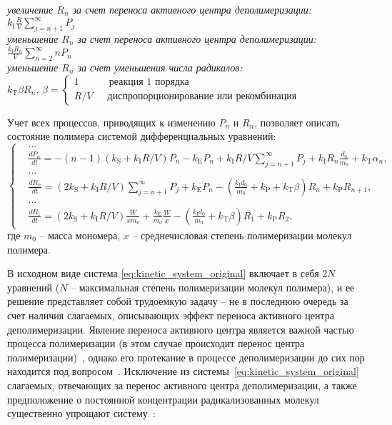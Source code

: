 \begin{center}
	\textit{увеличение $R_n$ за счет переноса активного центра деполимеризации:} \\
	${\displaystyle k_\mathrm{I} \frac{R}{V} \sum_{j=n+1}^{\infty} P_j}$ \\
	\textit{уменьшение $R_n$ за счет переноса активного центра деполимеризации:} \\
	${\displaystyle \frac{k_\mathrm{I} R_n}{V} \sum_{n=2}^{\infty} n P_n}$ \\
	\textit{уменьшение $R_n$ за счет уменьшения числа радикалов:} \\
	$k_\mathrm{T} \beta R_n$, $\beta = \left\{
	\begin{array}{l}
		1 \quad\quad\quad \text{реакция 1 порядка} \\
		R / V \quad\;\: \text{диспропорционирование или рекомбинация}
	\end{array}\right.$ \\
\end{center}

Учет всех процессов, приводящих к изменению $P_n$ и $R_n$, позволяет описать состояние полимера системой дифференциальных уравнений:
\begin{equation} \label{eq:kinetic_system_original}
	\left\{
	\begin{aligned}
		&\dots \\
		&\frac{d P_n}{d t} = -(n-1)\left(k_\mathrm{S} + k_\mathrm{I} R / V\right) P_n - k_\mathrm{E} P_n + k_\mathrm{I} R / V \sum_{j=n+1}^{\infty} P_j + k_\mathrm{I} R_n \frac{d_0}{m_0} + k_\mathrm{T} \alpha_n, \\
		&\dots \\
		&\frac{d R_n}{d t} = \left(2 k_\mathrm{S} + k_\mathrm{I} R / V\right) \sum_{j=n+1}^{\infty} P_j + k_\mathrm{E} P_n - \left(\frac{k_\mathrm{I} d_0}{m_0} + k_\mathrm{P} + k_\mathrm{T} \beta\right) R_n + k_\mathrm{P} R_{n+1}, \\
		&\dots \\
		&\frac{d R_1}{d t} = \left(2 k_\mathrm{S} + k_\mathrm{I} R / V\right) \frac{W}{x m_0} + \frac{k_\mathrm{E}}{m_0} \frac{W}{x} - \left(\frac{k_\mathrm{I} d_0}{m_0} + k_\mathrm{T} \beta\right) R_1 + k_\mathrm{P} R_2,
	\end{aligned}
	\right.
\end{equation}
где $m_0$ -- масса мономера, $x$ -- среднечисловая степень полимеризации молекул полимера. 

В исходном виде система \ref{eq:kinetic_system_original} включает в себя 2$N$ уравнений ($N$ -- максимальная степень полимеризации молекул полимера), и ее решение представляет собой трудоемкую задачу -- не в последнюю очередь за счет наличия слагаемых, описывающих эффект переноса активного центра деполимеризации. Явление переноса активного центра является важной частью процесса полимеризации (в этом случае происходит перенос центра полимеризации)~\cite{chain_transfer_polymerization}, однако его протекание в процессе деполимеризации до сих пор находится под вопросом~\cite{Mita_PMMA_zip_lengths_T}. Исключение из системы~\ref{eq:kinetic_system_original} слагаемых, отвечающих за перенос активного центра деполимеризации, а также предположение о постоянной концентрации радикализованных молекул существенно упрощают систему~\cite{Boyd_3}:

